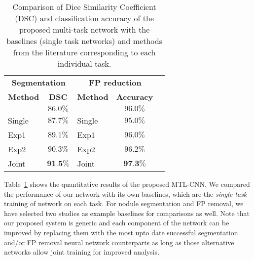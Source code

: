 \documentclass[preprint,12pt]{elsarticle}
\begin{document}
\begin{table}[h]
\centering
\caption{Comparison of Dice Similarity Coefficient (DSC) and classification accuracy of the proposed multi-task network with the baselines (single task networks) and methods from the literature corresponding to each individual task. }
\label{table:comparison}
\begin{tabular}{|l|c|l|c|l}
\cline{1-4}
\multicolumn{2}{|c|}{\cellcolor[HTML]{b2b2b2} \textbf{Segmentation}} & \multicolumn{2}{c|}{\cellcolor[HTML]{b2b2b2} \textbf{FP reduction}} &  \\ \cline{1-4}
\multicolumn{1}{|c|}{ \textbf{Method}} &  \textbf{DSC}  & \multicolumn{1}{c|}{ \textbf{Method}} &  \textbf{Accuracy} &  \\ \cline{1-4}
 \cite{khosravan2016gaze2segment}  &   $86.0\%$    &  \cite{dou2017multilevel}  &  $96.0\%$  &  \\ \cline{1-4}
 Single &   $87.7\%$  &    Single   &   $95.0\%$   &  \\ \cline{1-4}
 Exp1 &   $89.1\%$  &    Exp1   &   $96.0\%$   &  \\ \cline{1-4}
 Exp2 &   $90.3\%$  &    Exp2   &   $96.2\%$   &  \\ \cline{1-4}
   Joint  &    $\textbf{91.5\%}$    & Joint &  $\textbf{97.3\%}$   &  \\ \cline{1-4}
\end{tabular}
\end{table}

Table~\ref{table:comparison} shows the quantitative results of the proposed MTL-CNN. We compared the performance of our network with its own baselines, which are the \textit{single task} training of network on each task. For nodule segmentation and FP removal, we have selected two studies as example baselines for comparisons as well. Note that our proposed system is generic and each component of the network can be improved by replacing them with the most upto date successful segmentation and/or FP removal neural network counterparts as long as those alternative networks allow joint training for improved analysis.





\end{document}
